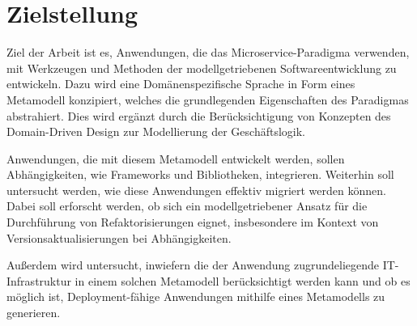 \section{Zielstellung}

Ziel der Arbeit ist es, Anwendungen, die das Microservice-Paradigma verwenden, mit Werkzeugen und Methoden der modellgetriebenen Softwareentwicklung zu entwickeln. Dazu wird eine Domänenspezifische Sprache in Form eines Metamodell konzipiert, welches die grundlegenden Eigenschaften des Paradigmas abstrahiert. Dies wird ergänzt durch die Berücksichtigung von Konzepten des Domain-Driven Design zur Modellierung der Geschäftslogik.

Anwendungen, die mit diesem Metamodell entwickelt werden, sollen Abhängigkeiten, wie Frameworks und Bibliotheken, integrieren. Weiterhin soll untersucht werden, wie diese Anwendungen effektiv migriert werden können. Dabei soll erforscht werden, ob sich ein modellgetriebener Ansatz für die Durchführung von Refaktorisierungen eignet, insbesondere im Kontext von Versionsaktualisierungen bei Abhängigkeiten.

Außerdem wird untersucht, inwiefern die der Anwendung zugrundeliegende IT-Infrastruktur in einem solchen Metamodell berücksichtigt werden kann und ob es möglich ist, Deployment-fähige Anwendungen mithilfe eines Metamodells zu generieren.